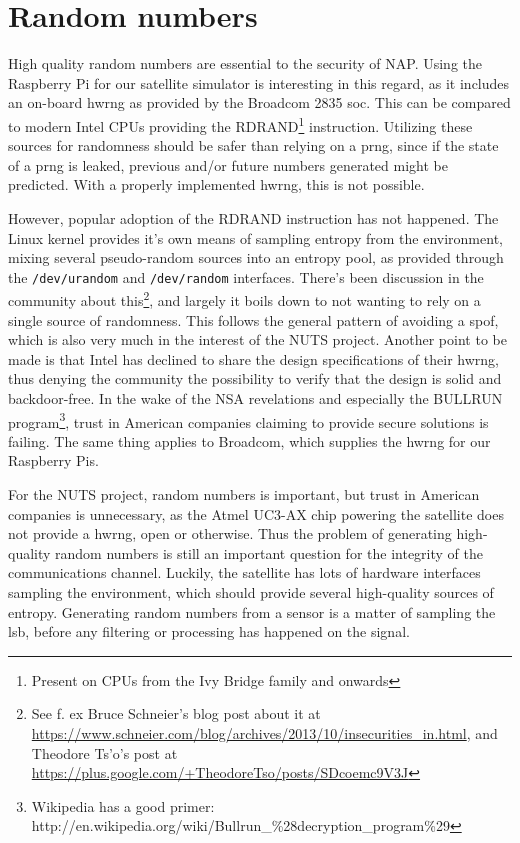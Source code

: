 \chapter{Random numbers}
\label{chp:random-numbers}

High quality random numbers are essential to the security of NAP. Using the Raspberry Pi for our satellite simulator is interesting in this regard, as it includes an on-board \gls{hwrng} as provided by the Broadcom 2835 \gls{soc}. This can be compared to modern Intel CPUs providing the RDRAND\footnote{Present on CPUs from the Ivy Bridge family and onwards} instruction. Utilizing these sources for randomness should be safer than relying on a \gls{prng}, since if the state of a \gls{prng} is leaked, previous and/or future numbers generated might be predicted. With a properly implemented \gls{hwrng}, this is not possible.

However, popular adoption of the RDRAND instruction has not happened. The Linux kernel provides it's own means of sampling entropy from the environment, mixing several pseudo-random sources into an entropy pool, as provided through the \texttt{/dev/urandom} and \texttt{/dev/random} interfaces. There's been discussion in the community about this\footnote{See f. ex Bruce Schneier's blog post about it at \url{https://www.schneier.com/blog/archives/2013/10/insecurities_in.html}, and Theodore Ts'o's post at \url{https://plus.google.com/+TheodoreTso/posts/SDcoemc9V3J}}, and largely it boils down to not wanting to rely on a single source of randomness. This follows the general pattern of avoiding a \gls{spof}, which is also very much in the interest of the NUTS project. Another point to be made is that Intel has declined to share the design specifications of their \gls{hwrng}, thus denying the community the possibility to verify that the design is solid and backdoor-free. In the wake of the NSA revelations and especially the BULLRUN program\footnote{Wikipedia has a good primer: http://en.wikipedia.org/wiki/Bullrun\_\%28decryption\_program\%29}, trust in American companies claiming to provide secure solutions is failing. The same thing applies to Broadcom, which supplies the \gls{hwrng} for our Raspberry Pis.

For the NUTS project, random numbers is important, but trust in American companies is unnecessary, as the Atmel UC3-AX chip powering the satellite does not provide a \gls{hwrng}, open or otherwise. Thus the problem of generating high-quality random numbers is still an important question for the integrity of the communications channel. Luckily, the satellite has lots of hardware interfaces sampling the environment, which should provide several high-quality sources of entropy. Generating random numbers from a sensor is a matter of sampling the \gls{lsb}, before any filtering or processing has happened on the signal.

